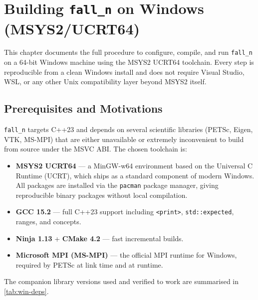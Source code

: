 
\chapter{Building \texttt{fall\_n} on Windows (MSYS2/UCRT64)}
\label{ch:windows-build}

This chapter documents the full procedure to configure, compile, and run
\texttt{fall\_n} on a 64-bit Windows machine using the MSYS2 UCRT64 toolchain.
Every step is reproducible from a clean Windows install and does not require
Visual Studio, WSL, or any other Unix compatibility layer beyond MSYS2 itself.

\section{Prerequisites and Motivations}
\label{sec:win-prereqs}

\texttt{fall\_n} targets C++23 and depends on several scientific libraries
(PETSc, Eigen, VTK, MS-MPI) that are either unavailable or extremely
inconvenient to build from source under the MSVC ABI.  The chosen toolchain is:

\begin{itemize}
  \item \textbf{MSYS2 UCRT64} --- a MinGW-w64 environment based on the
        Universal C Runtime (UCRT), which ships as a standard component of
        modern Windows.  All packages are installed via the \texttt{pacman}
        package manager, giving reproducible binary packages without local
        compilation.
  \item \textbf{GCC 15.2} --- full C++23 support including \texttt{<print>},
        \texttt{std::expected}, ranges, and concepts.
  \item \textbf{Ninja 1.13} + \textbf{CMake 4.2} --- fast incremental builds.
  \item \textbf{Microsoft MPI (MS-MPI)} --- the official MPI runtime for
        Windows, required by PETSc at link time and at runtime.
\end{itemize}

The companion library versions used and verified to work are summarised in
\autoref{tab:win-deps}.

